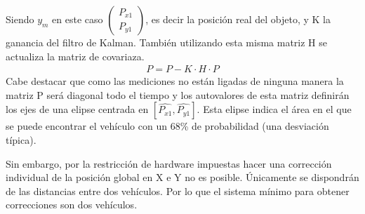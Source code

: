 Siendo $y_{m}$ en este caso $\begin{pmatrix}
P_{x1}\\
P_{y1} 
\end{pmatrix}$, es decir la posición real del objeto, y K la ganancia del filtro de Kalman. 
También utilizando esta misma matriz H se actualiza la matriz de covariaza. 
\begin{equation*}
\left.
 \begin{aligned}
P=P-K·H·P
\end{aligned}
\right.
\end{equation*}
Cabe destacar que como las mediciones no están ligadas de ninguna manera la matriz P será diagonal todo el tiempo y los autovalores de esta matriz definirán los ejes de una elipse centrada en $[\hat{P_{x1}},\hat{P_{y1}}]$. Esta elipse indica el área en el que se puede encontrar el vehículo con un 68\% de probabilidad (una desviación típica). 
\par 




Sin embargo, por la restricción de hardware impuestas hacer una corrección individual de la posición global en X e Y no es posible. Únicamente se dispondrán de las distancias entre dos vehículos. Por lo que el sistema mínimo para obtener correcciones son dos vehículos. 
\newpage

